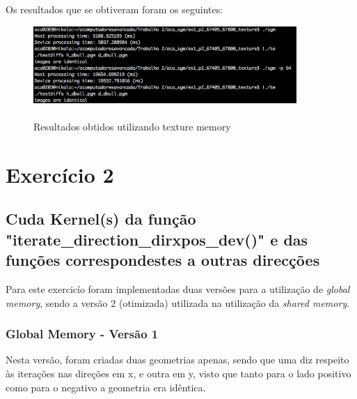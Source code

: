 \documentclass[pdftex,12pt,a4paper]{report}
\begin{document}
Os resultados que se obtiveram foram os seguintes:

\begin{figure}[!htb]
\center
 \includegraphics[width=100mm,scale=1]{DetermineCostsTexture.png}
 \caption{\\ Resultados obtidos utilizando texture memory}
 \label{fig:DetermineCostsTexture}
\end{figure}

\newpage
\section{Exercício 2}

\subsection{Cuda Kernel(s) da função "iterate\_direction\_dirxpos\_dev()" e das funções correspondestes a outras direcções}

Para este exercicío foram implementadas duas versões para a utilização de \textit{global memory}, sendo a versão 2 (otimizada) utilizada na utilização da \textit{shared memory}.

\subsubsection{Global Memory - Versão 1}

Nesta versão, foram criadas duas geometrias apenas, sendo que uma diz respeito às iterações nas direções em x, e outra em y, visto que tanto para o lado positivo como para o negativo a geometria era idêntica.
\end{document}
